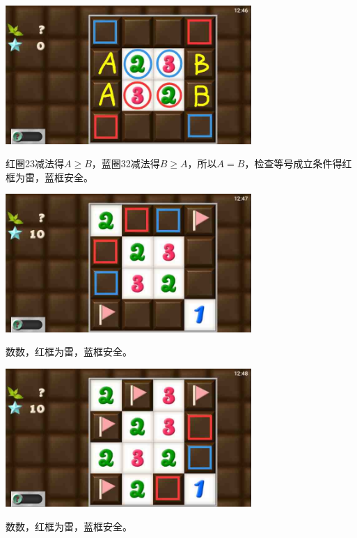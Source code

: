 \subsection{} %
\begin{center}
    \includegraphics[width=0.7\textwidth]{puzzlelow/135-1.jpg}
\end{center}
红圈23减法得$A\ge B$，蓝圈32减法得$B\ge A$，所以$A=B$，检查等号成立条件得红框为雷，蓝框安全。
\begin{center}
    \includegraphics[width=0.7\textwidth]{puzzlelow/135-2.jpg}
\end{center}
数数，红框为雷，蓝框安全。
\begin{center}
    \includegraphics[width=0.7\textwidth]{puzzlelow/135-3.jpg}
\end{center}
数数，红框为雷，蓝框安全。

